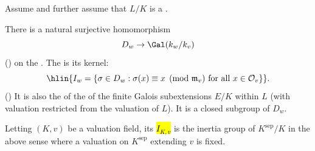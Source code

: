 \begin{definition} \label{definition:inertia_group_of_a_general_galois_extension_of_valuation_fields}
    Assume  and further assume that $L/K$ is a .

    There is a natural surjective homomorphism 
    $$D_w \to \Gal(k_w / k_v)$$
    ()
    on the . The  is its kernel: 
    $$\hlin{I_w = \{\sigma \in D_w : \sigma(x) \equiv x \pmod{\mathfrak{m}_v} \text{ for all } x \in \mathcal{O}_v \}}.$$
    ()  It is also the  of the  of the finite Galois subextensions $E/K$ within $L$ (with valuation restricted from the valuation of $L$). It is a closed subgroup of $D_w$.

    Letting $(K,v)$ be a valuation field, its  \hl{$I_{K,v}$} is the inertia group of $K^{\text{sep}} / K$ in the above sense where a valuation on $K^{\text{sep}}$ extending $v$ is fixed.

\end{definition}